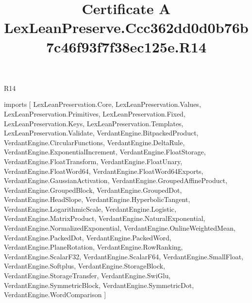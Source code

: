 \begin{lexlean}{R14}
\title{Certificate A LexLeanPreserve.Ccc362dd0d0b76b7c46f93f7f38ec125e.R14}
\begin{coremodule}
imports [
  LexLeanPreservation.Core,
  LexLeanPreservation.Values,
  LexLeanPreservation.Primitives,
  LexLeanPreservation.Fixed,
  LexLeanPreservation.Keys,
  LexLeanPreservation.Templates,
  LexLeanPreservation.Validate,
  VerdantEngine.BitpackedProduct,
  VerdantEngine.CircularFunctions,
  VerdantEngine.DeltaRule,
  VerdantEngine.ExponentialIncrement,
  VerdantEngine.FloatStorage,
  VerdantEngine.FloatTransform,
  VerdantEngine.FloatUnary,
  VerdantEngine.FloatWord64,
  VerdantEngine.FloatWord64Exports,
  VerdantEngine.GaussianActivation,
  VerdantEngine.GroupedAffineProduct,
  VerdantEngine.GroupedBlock,
  VerdantEngine.GroupedDot,
  VerdantEngine.HeadSlope,
  VerdantEngine.HyperbolicTangent,
  VerdantEngine.LogarithmicScale,
  VerdantEngine.Logistic,
  VerdantEngine.MatrixProduct,
  VerdantEngine.NaturalExponential,
  VerdantEngine.NormalizedExponential,
  VerdantEngine.OnlineWeightedMean,
  VerdantEngine.PackedDot,
  VerdantEngine.PackedWord,
  VerdantEngine.PlaneRotation,
  VerdantEngine.RowRanking,
  VerdantEngine.ScalarF32,
  VerdantEngine.ScalarF64,
  VerdantEngine.SmallFloat,
  VerdantEngine.Softplus,
  VerdantEngine.StorageBlock,
  VerdantEngine.StorageTransfer,
  VerdantEngine.SwiGlu,
  VerdantEngine.SymmetricBlock,
  VerdantEngine.SymmetricDot,
  VerdantEngine.WordComparison
]


\end{coremodule}
\end{lexlean}
